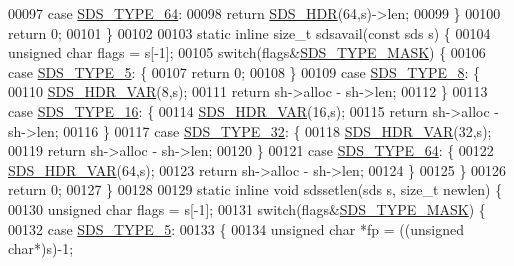 \begin{DoxyCode}
00097         \textcolor{keywordflow}{case} \hyperlink{sds_8h_ad03c6e0fdab3a871e10cce347e8bb4e6}{SDS\_TYPE\_64}:
00098             \textcolor{keywordflow}{return} \hyperlink{sds_8h_a0f1b0d97d094e8505c1d46f95c6cbc30}{SDS\_HDR}(64,s)->len;
00099     \}
00100     \textcolor{keywordflow}{return} 0;
00101 \}
00102 
00103 \textcolor{keyword}{static} \textcolor{keyword}{inline} size\_t sdsavail(\textcolor{keyword}{const} sds s) \{
00104     \textcolor{keywordtype}{unsigned} \textcolor{keywordtype}{char} flags = s[-1];
00105     \textcolor{keywordflow}{switch}(flags&\hyperlink{sds_8h_a07564783f389fdd7772a8f61d55d9ddf}{SDS\_TYPE\_MASK}) \{
00106         \textcolor{keywordflow}{case} \hyperlink{sds_8h_a3b7b67f1efa75f6b78ae18ea853b1a91}{SDS\_TYPE\_5}: \{
00107             \textcolor{keywordflow}{return} 0;
00108         \}
00109         \textcolor{keywordflow}{case} \hyperlink{sds_8h_a504136356f04bfa2fd616dd4c8fdd71c}{SDS\_TYPE\_8}: \{
00110             \hyperlink{sds_8h_a79b76920d1d9bc010926b7af167de89b}{SDS\_HDR\_VAR}(8,s);
00111             \textcolor{keywordflow}{return} sh->alloc - sh->len;
00112         \}
00113         \textcolor{keywordflow}{case} \hyperlink{sds_8h_aa54044bf70a30824caeb1bab3615bff2}{SDS\_TYPE\_16}: \{
00114             \hyperlink{sds_8h_a79b76920d1d9bc010926b7af167de89b}{SDS\_HDR\_VAR}(16,s);
00115             \textcolor{keywordflow}{return} sh->alloc - sh->len;
00116         \}
00117         \textcolor{keywordflow}{case} \hyperlink{sds_8h_a0ad2103bbdaa2fe5511ce3279cb42293}{SDS\_TYPE\_32}: \{
00118             \hyperlink{sds_8h_a79b76920d1d9bc010926b7af167de89b}{SDS\_HDR\_VAR}(32,s);
00119             \textcolor{keywordflow}{return} sh->alloc - sh->len;
00120         \}
00121         \textcolor{keywordflow}{case} \hyperlink{sds_8h_ad03c6e0fdab3a871e10cce347e8bb4e6}{SDS\_TYPE\_64}: \{
00122             \hyperlink{sds_8h_a79b76920d1d9bc010926b7af167de89b}{SDS\_HDR\_VAR}(64,s);
00123             \textcolor{keywordflow}{return} sh->alloc - sh->len;
00124         \}
00125     \}
00126     \textcolor{keywordflow}{return} 0;
00127 \}
00128 
00129 \textcolor{keyword}{static} \textcolor{keyword}{inline} \textcolor{keywordtype}{void} sdssetlen(sds s, size\_t newlen) \{
00130     \textcolor{keywordtype}{unsigned} \textcolor{keywordtype}{char} flags = s[-1];
00131     \textcolor{keywordflow}{switch}(flags&\hyperlink{sds_8h_a07564783f389fdd7772a8f61d55d9ddf}{SDS\_TYPE\_MASK}) \{
00132         \textcolor{keywordflow}{case} \hyperlink{sds_8h_a3b7b67f1efa75f6b78ae18ea853b1a91}{SDS\_TYPE\_5}:
00133             \{
00134                 \textcolor{keywordtype}{unsigned} \textcolor{keywordtype}{char} *fp = ((\textcolor{keywordtype}{unsigned} \textcolor{keywordtype}{char}*)s)-1;

\end{DoxyCode}
